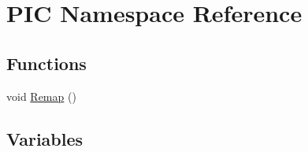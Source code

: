 \hypertarget{namespace_p_i_c}{}\section{P\+IC Namespace Reference}
\label{namespace_p_i_c}
\subsection*{Functions}
\begin{DoxyCompactItemize}
\item 
void \hyperlink{namespace_p_i_c_a2a04fe95329faacc43f00ad30fe554b9}{Remap} ()
\end{DoxyCompactItemize}
\subsection*{Variables}
